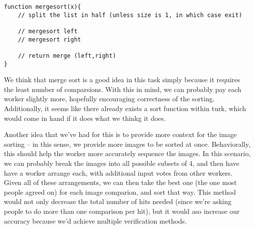 \documentclass[11pt]{article}
\begin{document}
\begin{enumerate}
\begin{lstlisting}
function mergesort(x){
    // split the list in half (unless size is 1, in which case exit)
    
    // mergesort left
    // mergesort right
    
    // return merge (left,right)
}
\end{lstlisting}
We think that merge sort is a good idea in this task simply because it requires the least number of comparsions. With this in mind, we can probably pay each worker slightly more, hopefully encouraging correctness of the sorting. Additionally, it seems like there already exists a sort function within turk, which would come in hand if it does what we thinkg it does. 

Another idea that we've had for this is to provide more context for the image sorting -- in this sense, we provide more images to be sorted at once. Behaviorally, this should help the worker more accurately sequence the images. In this scenario, we can probably break the images into all possible subsets of 4, and then have have a worker arrange each, with additional input votes from other workers. Given all of these arrangements, we can then take the best one (the one most people agreed on) for each image comparion, and sort that way. This method would not only decrease the total number of hits needed (since we're asking people to do more than one comparison per hit), but it would aso increase our accuracy because we'd achieve multiple verification methods. 

\begin{comment}
* The Below Can Be Ignored *

you're the worst. :) THE WORST.

HI :)

You love me. 

Let's be clear.

false.

Patently false.

...watch us forget to delete this and it'll end up in the final writeup.

That would be hilarious :)

I would not be against that. 

Let's do it.

Hi Professor Parkes!

Also, we should work on our project proposal.

Are you going to bed soon? Always time tomorrow. please? After 2:30, I am free.

Of course :) 


\end{comment}
\end{enumerate}
\end{document}

